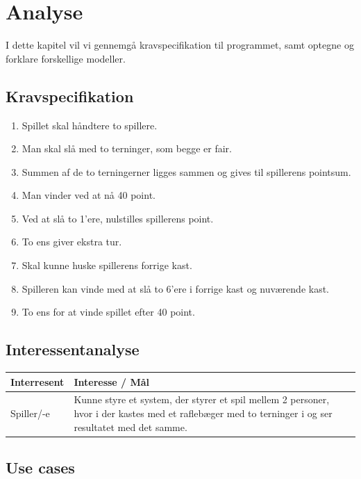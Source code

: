 \chapter{Analyse}

I dette kapitel vil vi gennemgå kravspecifikation til programmet, samt optegne og forklare forskellige modeller.


\section{Kravspecifikation}

\begin{enumerate}
    \item Spillet skal håndtere to spillere.
    \item Man skal slå med to terninger, som begge er fair.
    \item Summen af de to terningerner ligges sammen og gives til spillerens pointsum.
    \item Man vinder ved at nå 40 point.
    \item Ved at slå to 1'ere, nulstilles spillerens point.
    \item To ens giver ekstra tur.
    \item Skal kunne huske spillerens forrige kast.
    \item Spilleren kan vinde med at slå to 6'ere i forrige kast og nuværende kast.
    \item To ens for at vinde spillet efter 40 point.
\end{enumerate}

\section{Interessentanalyse}

\begin{center}
    \begin{tabular}{ | l | p{13cm} |}
    \hline
    \textbf{Interresent} & \textbf{Interesse / Mål} \\ \hline
    Spiller/-e & Kunne styre et system, der styrer et spil mellem 2 personer, 
    hvor i der kastes med et raflebæger med to terninger i og ser resultatet med det samme. \\ \hline
    \hline
    \end{tabular}
\end{center}

\section{Use cases}

